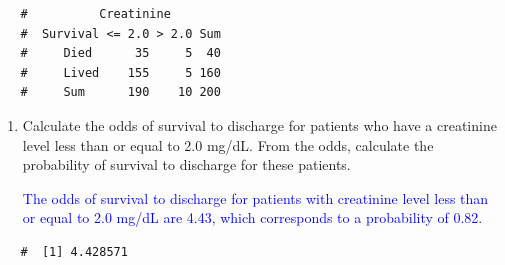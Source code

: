 \documentclass[letterpaper,12pt,twoside,]{pinp}
\begin{document}
\begin{enumerate}
\begin{Shaded}
\begin{Highlighting}[]
\NormalTok{(}\OperatorTok{$}\OperatorTok{$}
        \NormalTok{(}\NormalTok{, }\NormalTok{)))}
\end{Highlighting}
\end{Shaded}

  \begin{ShadedResult}
   \begin{verbatim}
   #          Creatinine
   #  Survival <= 2.0 > 2.0 Sum
   #     Died      35     5  40
   #     Lived    155     5 160
   #     Sum      190    10 200
   \end{verbatim}
   \end{ShadedResult}

  \begin{enumerate}
  \def\labelenumii{\alph{enumii})}
  \item
    Calculate the odds of survival to discharge for patients who have a
    creatinine level less than or equal to 2.0 mg/dL. From the odds,
    calculate the probability of survival to discharge for these
    patients.

    \textcolor{blue}{The odds of survival to discharge for patients with creatinine level less than or equal to 2.0 mg/dL are 4.43, which corresponds to a probability of 0.82.}
  \end{enumerate}

\begin{Shaded}
\begin{Highlighting}[]
\StringTok{ }\OperatorTok{/}
\end{Highlighting}
\end{Shaded}

  \begin{ShadedResult}
   \begin{verbatim}
   #  [1] 4.428571
   \end{verbatim}
   \end{ShadedResult}

\begin{Shaded}
\begin{Highlighting}[]
\StringTok{ }\OperatorTok{/}\NormalTok{(} \OperatorTok{+}\StringTok{ }
\end{Highlighting}
\end{Shaded}


\end{enumerate}
\end{document}
